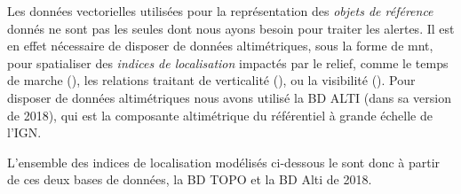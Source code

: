 Les données vectorielles utilisées pour la représentation des
\emph{objets de référence} donnés ne sont pas les seules dont nous
ayons besoin pour traiter les alertes. Il est en effet nécessaire de
disposer de données altimétriques, sous la forme de \ac{mnt}, pour
spatialiser des \emph{indices de localisation} impactés par le relief,
comme le temps de marche (), les
relations traitant de verticalité (\eg {}), ou
la visibilité (). Pour disposer de
données altimétriques nous avons utilisé la BD ALTI (dans sa version
de 2018), qui est la composante altimétrique du référentiel à grande
échelle de l'IGN.

L'ensemble des indices de localisation modélisés ci-dessous le sont
donc à partir de ces deux bases de données, la BD TOPO et la BD Alti
de 2018.

